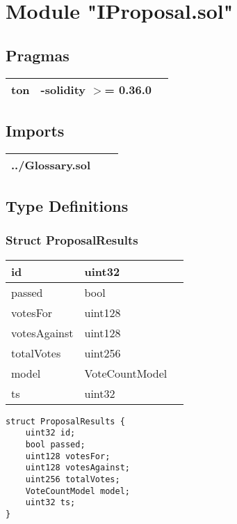 
\section{Module "IProposal.sol"}


\subsection{Pragmas}


\noindent\begin{tabular}{|l|l|p{5cm}|}\hline
ton & -solidity $>$= 0.36.0 &\\\hline
\end{tabular}


\subsection{Imports}


\noindent\begin{tabular}{|l|l|p{5cm}|}\hline
../Glossary.sol &\\\hline
\end{tabular}


\subsection{Type Definitions}


\subsubsection{Struct ProposalResults}


\ifsoltables
\noindent\begin{tabular}{|l|l|p{6cm}|}\hline
id & uint32 & \\\hline
passed & bool & \\\hline
votesFor & uint128 & \\\hline
votesAgainst & uint128 & \\\hline
totalVotes & uint256 & \\\hline
model & VoteCountModel & \\\hline
ts & uint32 & \\\hline
\end{tabular}
\fi


\begin{lstlisting}[firstnumber=5]
struct ProposalResults {
    uint32 id;
    bool passed;
    uint128 votesFor;
    uint128 votesAgainst;
    uint256 totalVotes;
    VoteCountModel model;
    uint32 ts;
}
\end{lstlisting}

